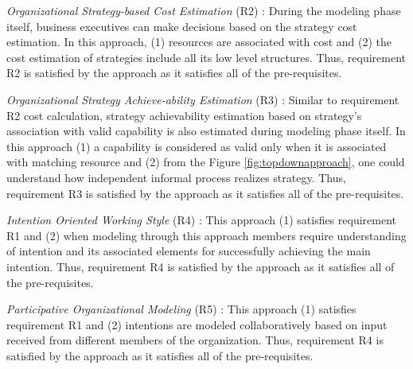 \textit{Organizational Strategy-based Cost Estimation} (R2) : During the modeling phase itself, business executives can make decisions based on the strategy cost estimation. In this approach, (1) resources are associated with cost and (2) the cost estimation of strategies include all its low level structures. Thus, requirement R2 is satisfied by the approach as it satisfies all of the pre-requisites. 

\textit{Organizational Strategy Achieve-ability Estimation} (R3) : Similar to requirement R2 cost calculation, strategy achievability estimation based on strategy's association with valid capability is also estimated during modeling phase itself. In this approach (1) a capability is considered as valid only when it is associated with matching resource and (2) from the Figure \ref{fig:topdownapproach}, one could understand how independent informal process realizes strategy. Thus, requirement R3 is satisfied by the approach as it satisfies all of the pre-requisites.

\textit{Intention Oriented Working Style} (R4) : This approach (1) satisfies requirement R1 and (2) when modeling through this approach members require understanding of intention and its associated elements for successfully achieving the main intention. Thus, requirement R4 is satisfied by the approach as it satisfies all of the pre-requisites.

\textit{Participative Organizational Modeling} (R5) : This approach (1) satisfies requirement R1 and  (2) intentions are modeled collaboratively based on input received from different members of the organization. Thus, requirement R4 is satisfied by the approach as it satisfies all of the pre-requisites. 

